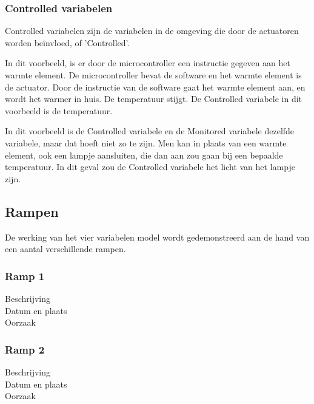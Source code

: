 \documentclass{article}
\begin{document}
			\subsubsection{Controlled variabelen}

			Controlled variabelen zijn de variabelen in de omgeving die door de actuatoren worden beïnvloed, of 'Controlled'.

			In dit voorbeeld, is er door de microcontroller een instructie gegeven aan het warmte element. De microcontroller bevat de software en het warmte element is de actuator. Door de instructie van de software gaat het warmte element aan, en wordt het warmer in huis. De temperatuur stijgt. De Controlled variabele in dit voorbeeld is de temperatuur.

			
			In dit voorbeeld is de Controlled variabele en de Monitored variabele dezelfde variabele, maar dat hoeft niet zo te zijn. Men kan in plaats van een warmte element, ook een lampje aansluiten, die dan aan zou gaan bij een bepaalde temperatuur. In dit geval zou de Controlled variabele het licht van het lampje zijn.
		
		\subsection{Rampen}
		
		De werking van het vier variabelen model wordt gedemonstreerd aan de hand van een aantal verschillende rampen.
		
			\subsubsection{Ramp 1}
			\begin{description}
			\item[Beschrijving]
			\item[Datum en plaats] 
			\item[Oorzaak]
			\end{description}
			
			\subsubsection{Ramp 2}
			\begin{description}
			\item[Beschrijving]
			\item[Datum en plaats] 
			\item[Oorzaak]
			\end{description}
			
\end{document}
